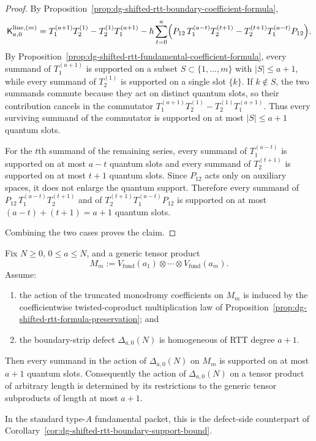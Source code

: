 \begin{proof}
By
Proposition~\ref{prop:dg-shifted-rtt-boundary-coefficient-formula},
\[
\mathsf{K}^{\mathrm{line},(m)}_{a,0}
=
T_1^{(a+1)}T_2^{(1)}-T_2^{(1)}T_1^{(a+1)}
-\hbar\sum_{t=0}^{a}
\Bigl(
P_{12}\,T_1^{(a-t)}T_2^{(t+1)}
-T_2^{(t+1)}T_1^{(a-t)}P_{12}
\Bigr).
\]
By
Proposition~\ref{prop:dg-shifted-rtt-fundamental-coefficient-formula},
every summand of $T_1^{(a+1)}$ is supported on a subset
$S\subset\{1,\dots,m\}$ with $|S|\le a+1$, while every summand of
$T_2^{(1)}$ is supported on a single slot $\{k\}$.  If $k\notin S$,
the two summands commute because they act on distinct quantum slots,
so their contribution cancels in the commutator
$T_1^{(a+1)}T_2^{(1)}-T_2^{(1)}T_1^{(a+1)}$.  Thus every surviving
summand of the commutator is supported on at most $|S|\le a+1$ quantum
slots.

For the $t$th summand of the remaining series, every summand of
$T_1^{(a-t)}$ is supported on at most $a-t$ quantum slots and every
summand of $T_2^{(t+1)}$ is supported on at most $t+1$ quantum slots.
Since $P_{12}$ acts only on auxiliary spaces, it does not enlarge the
quantum support.  Therefore every summand of
$P_{12}\,T_1^{(a-t)}T_2^{(t+1)}$ and of
$T_2^{(t+1)}T_1^{(a-t)}P_{12}$ is supported on at most
$(a-t)+(t+1)=a+1$ quantum slots.

Combining the two cases proves the claim.
\end{proof}

\begin{proposition}
\label{prop:dg-shifted-rtt-defect-support-mechanism}
Fix $N \ge 0$, $0\le a\le N$, and a generic tensor product
\[
M_m:=V_{\mathrm{fund}}(a_1)\otimes\cdots\otimes
V_{\mathrm{fund}}(a_m).
\]
Assume:
\begin{enumerate}[label=\textup{(\roman*)}]
\item the action of the truncated monodromy coefficients on $M_m$ is
  induced by the coefficientwise twisted-coproduct multiplication law
  of Proposition~\ref{prop:dg-shifted-rtt-formula-preservation}; and
\item the boundary-strip defect $\Delta_{a,0}(N)$ is homogeneous of RTT
  degree $a+1$.
\end{enumerate}
Then every summand in the action of $\Delta_{a,0}(N)$ on $M_m$ is
supported on at most $a+1$ quantum slots.  Consequently the action of
$\Delta_{a,0}(N)$ on a tensor product of arbitrary length is
determined by its restrictions to the generic tensor subproducts of
length at most $a+1$.

In the standard type-$A$ fundamental packet, this is the defect-side
counterpart of
Corollary~\ref{cor:dg-shifted-rtt-boundary-support-bound}.
\end{proposition}

